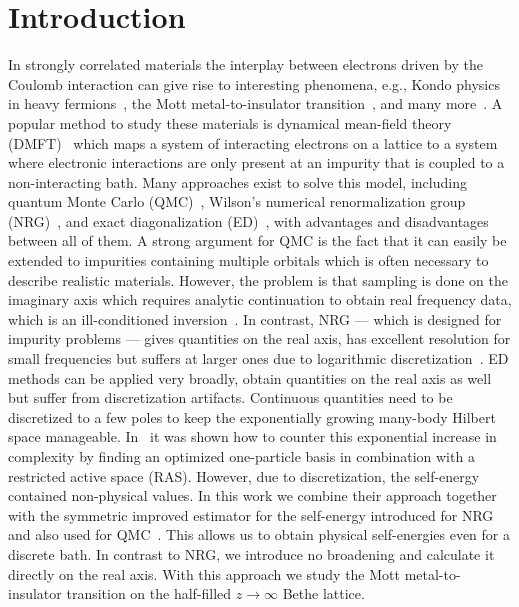 
\chapter{Introduction}

In strongly correlated materials the interplay between electrons
driven by the Coulomb interaction
can give rise to interesting phenomena, e.g.,
Kondo physics in heavy fermions~\cite{Stewart1984, Hewson1993},
the Mott metal-to-insulator transition~\cite{Belitz1994, Imada1998},
and many more~\cite{Martin2016}.
A popular method to study these materials is dynamical mean-field theory
(DMFT)~\cite{Metzner1989, Georges1996, Held2007}
which maps a system of interacting electrons on a lattice
to a system where electronic interactions are only present at an impurity
that is coupled to a non-interacting bath.
Many approaches exist to solve this model,
including quantum Monte Carlo (QMC)~\cite{Hirsch1986, Gull2011, Wallerberger2016, Wallerberger2019},
Wilson's numerical renormalization group (NRG)~\cite{Wilson1975, Bulla1998, Bulla1999, Bulla2008},
and exact diagonalization (ED)~\cite{Jaklic1994, Caffarel1994, Capone2007, Lu2014, Lu2019},
with advantages and disadvantages between all of them.
A strong argument for QMC is the fact that it can easily be extended to
impurities containing multiple orbitals which is often necessary to describe realistic materials.
However, the problem is that sampling is done on the imaginary axis which requires
analytic continuation to obtain real frequency data,
which is an ill-conditioned inversion~\cite{Jarrell1996, Beach2000, Kaufmann2023}.
In contrast, NRG --- which is designed for impurity problems ---
gives quantities on the real axis,
has excellent resolution for small frequencies
but suffers at larger ones due to logarithmic discretization~\cite{Bulla2008}.
ED methods can be applied very broadly, obtain quantities on the real axis as well
but suffer from discretization artifacts.
Continuous quantities need to be discretized to a few poles
to keep the exponentially growing many-body Hilbert space manageable.
In~\cite{Lu2014, Lu2019} it was shown how to counter this exponential increase in complexity
by finding an optimized one-particle basis in combination with a restricted active space (RAS).
However, due to discretization, the self-energy contained non-physical values.
In this work we combine their approach together with the
symmetric improved estimator for the self-energy introduced for NRG~\cite{Kugler2022}
and also used for QMC~\cite{Kaufmann2019}.
This allows us to obtain physical self-energies even for a discrete bath.
In contrast to NRG, we introduce no broadening and calculate it directly on the real axis.
With this approach we study the Mott metal-to-insulator transition
on the half-filled $z\to\infty$ Bethe lattice.

